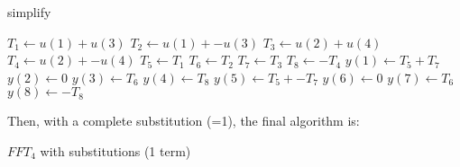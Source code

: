 \begin{command}{simplify}
\begin{algorithm}[h]
{$T_{1} \leftarrow u(1)  + u(3) $\;
$T_{2} \leftarrow u(1)  + -u(3) $\;
$T_{3} \leftarrow u(2)  + u(4) $\;
$T_{4} \leftarrow u(2)  + -u(4) $\;
$T_{5} \leftarrow T_{1}$\;
$T_{6} \leftarrow T_{2}$\;
$T_{7} \leftarrow T_{3}$\;
$T_{8} \leftarrow -T_{4}$\;
$y(1)  \leftarrow T_{5} + T_{7}$\;
$y(2)  \leftarrow 0$\;
$y(3)  \leftarrow T_{6}$\;
$y(4)  \leftarrow T_{8}$\;
$y(5)  \leftarrow T_{5} + -T_{7}$\;
$y(6)  \leftarrow 0$\;
$y(7)  \leftarrow T_{6}$\;
$y(8)  \leftarrow -T_{8}$\;
}
\end{algorithm}
Then, with a complete substitution (=1), the final algorithm is:
\begin{algorithm}[h]
\caption{$FFT_4$ with substitutions (1 term)\label{algo:FFT4_3}}
\SetLine
{}
\end{algorithm}
\end{command}


